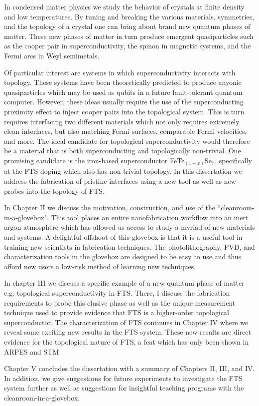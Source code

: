 In condensed matter physics we study the behavior of crystals at finite density and low temperatures. By tuning and breaking the various materials, symmetries, and the topology of a crystal one can bring about brand new quantum phases of matter. These new phases of matter in turn produce emergent quasiparticles such as the cooper pair in superconductivity, the spinon in magnetic systems, and the Fermi arcs in Weyl semimetals. \par
Of particular interest are systems in which superconductivity interacts with topology. These systems have been theoretically predicted to produce anyonic quasiparticles which may be used as qubits in a future fault-tolerant quantum computer. However, these ideas usually require the use of the superconducting proximity effect to inject cooper pairs into the topological system. This is turn requires interfacing two different materials which not only requires extremely clean interfaces, but also matching Fermi surfaces, comparable Fermi velocities, and more. The ideal candidate for topological superconductivity would therefore be a material that is both superconducting and topologically non-trivial. One promising candidate is the iron-based superconductor FeTe$_{(1-x)}$Se$_{x}$, specifically at the \ac{FTS} doping  which also has non-trivial topology. In this dissertation we address the fabrication of pristine interfaces using a new tool as well as new probes into the topology of \ac{FTS}.\par
In Chapter II we discuss the motivation, construction, and use of the ``cleanroom-in-a-glovebox". 
This tool places an entire nanofabrication workflow into an inert argon atmosphere which has allowed us access to study a myriad of new materials and systems. A delightful offshoot of this glovebox is that it is a useful tool in training new scientists in fabrication techniques. The photolithography, \ac{PVD}, and characterization tools in the glovebox are designed to be easy to use and thus afford new users a low-risk method of learning new techniques.\par
In chapter III we discuss a specific example of a new quantum phase of matter e.g. topological superconductivity in FTS. There, I discuss the fabrication requirements to probe this elusive phase as well as the unique measurement technique used to provide evidence that FTS is a higher-order topological superconductor. The characterization of FTS continues in Chapter IV where we reveal some exciting new results in the \ac{FTS} system. These new results are direct evidence for the topological nature of \ac{FTS}, a feat which has only been shown in \ac{ARPES} and \ac{STM}\par
Chapter V concludes the dissertation with a summary of Chapters II, III, and IV. In addition, we give suggestions for future experiments to investigate the FTS system further as well as suggestions for insightful teaching programs with the cleanroom-in-a-glovebox.
